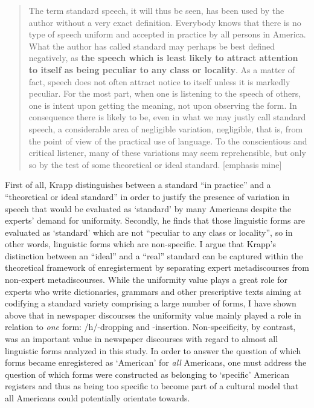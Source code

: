 \begin{quote}
The term standard speech, it will thus be seen, has been used by the author without a very exact definition. Everybody knows that there is no type of speech uniform and accepted in practice by all persons in America. What the author has called standard may perhaps be best defined negatively, as \textbf{the speech which is least likely to attract attention to itself as being peculiar to any class or locality}. As a matter of fact, speech does not often attract notice to itself unless it is markedly peculiar. For the most part, when one is listening to the speech of others, one is intent upon getting the meaning, not upon observing the form. In consequence there is likely to be, even in what we may justly call standard speech, a considerable area of negligible variation, negligible, that is, from the point of view of the practical use of language. To the conscientious and critical listener, many of these variations may seem reprehensible, but only so by the test of some theoretical or ideal standard. [emphasis mine]
\end{quote}


First of all, Krapp distinguishes between a standard “in practice” and a “theoretical or ideal standard” in order to justify the presence of variation in speech that would be evaluated as ‘standard’ by many Americans despite the experts’ demand for uniformity. Secondly, he finds that those linguistic forms are evaluated as ‘standard’ which are not “peculiar to any class or locality”, so in other words, linguistic forms which are non-specific. I argue that Krapp’s distinction between an “ideal” and a “real” standard can be captured within the theoretical framework of enregisterment by separating expert metadiscourses from non-expert metadiscourses. While the uniformity value plays a great role for experts who write dictionaries, grammars and other prescriptive texts aiming at codifying a standard variety comprising a large number of forms, I have shown above that in newspaper discourses the uniformity value mainly played a role in relation to \emph{one} form: /h/-dropping and -insertion. Non-specificity, by contrast, was an important value in newspaper discourses with regard to almost all linguistic forms analyzed in this study. In order to answer the question of which forms became enregistered as ‘American’ for \emph{all} Americans, one must address the question of which forms were constructed as belonging to ‘specific’ American registers and thus as being too specific to become part of a cultural model that all Americans could potentially orientate towards.


